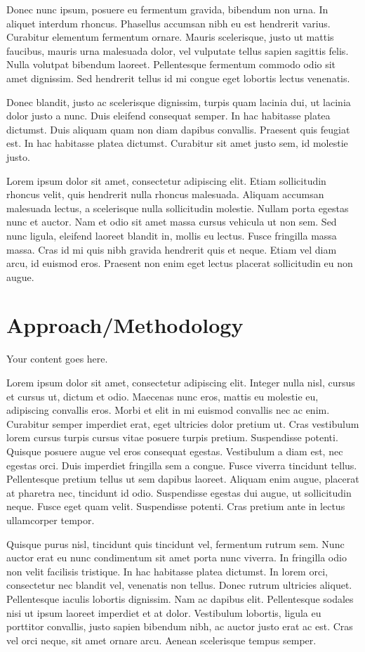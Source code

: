 \documentclass[12pt,lot,lof]{quthesis}
\begin{document}
Donec nunc ipsum, posuere eu fermentum gravida, bibendum non urna. In aliquet interdum rhoncus. Phasellus accumsan nibh eu est hendrerit varius. Curabitur elementum fermentum ornare. Mauris scelerisque, justo ut mattis faucibus, mauris urna malesuada dolor, vel vulputate tellus sapien sagittis felis. Nulla volutpat bibendum laoreet. Pellentesque fermentum commodo odio sit amet dignissim. Sed hendrerit tellus id mi congue eget lobortis lectus venenatis.

Donec blandit, justo ac scelerisque dignissim, turpis quam lacinia dui, ut lacinia dolor justo a nunc. Duis eleifend consequat semper. In hac habitasse platea dictumst. Duis aliquam quam non diam dapibus convallis. Praesent quis feugiat est. In hac habitasse platea dictumst. Curabitur sit amet justo sem, id molestie justo.

Lorem ipsum dolor sit amet, consectetur adipiscing elit. Etiam sollicitudin rhoncus velit, quis hendrerit nulla rhoncus malesuada. Aliquam accumsan malesuada lectus, a scelerisque nulla sollicitudin molestie. Nullam porta egestas nunc et auctor. Nam et odio sit amet massa cursus vehicula ut non sem. Sed nunc ligula, eleifend laoreet blandit in, mollis eu lectus. Fusce fringilla massa massa. Cras id mi quis nibh gravida hendrerit quis et neque. Etiam vel diam arcu, id euismod eros. Praesent non enim eget lectus placerat sollicitudin eu non augue.

\chapter{Approach/Methodology}
Your content goes here.

Lorem ipsum dolor sit amet, consectetur adipiscing elit. Integer nulla nisl, cursus et cursus ut, dictum et odio. Maecenas nunc eros, mattis eu molestie eu, adipiscing convallis eros. Morbi et elit in mi euismod convallis nec ac enim. Curabitur semper imperdiet erat, eget ultricies dolor pretium ut. Cras vestibulum lorem cursus turpis cursus vitae posuere turpis pretium. Suspendisse potenti. Quisque posuere augue vel eros consequat egestas. Vestibulum a diam est, nec egestas orci. Duis imperdiet fringilla sem a congue. Fusce viverra tincidunt tellus. Pellentesque pretium tellus ut sem dapibus laoreet. Aliquam enim augue, placerat at pharetra nec, tincidunt id odio. Suspendisse egestas dui augue, ut sollicitudin neque. Fusce eget quam velit. Suspendisse potenti. Cras pretium ante in lectus ullamcorper tempor.

Quisque purus nisl, tincidunt quis tincidunt vel, fermentum rutrum sem. Nunc auctor erat eu nunc condimentum sit amet porta nunc viverra. In fringilla odio non velit facilisis tristique. In hac habitasse platea dictumst. In lorem orci, consectetur nec blandit vel, venenatis non tellus. Donec rutrum ultricies aliquet. Pellentesque iaculis lobortis dignissim. Nam ac dapibus elit. Pellentesque sodales nisi ut ipsum laoreet imperdiet et at dolor. Vestibulum lobortis, ligula eu porttitor convallis, justo sapien bibendum nibh, ac auctor justo erat ac est. Cras vel orci neque, sit amet ornare arcu. Aenean scelerisque tempus semper.
\end{document}
